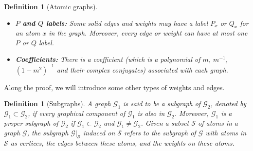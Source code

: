 \documentclass{article}
\newcommand{\1}{\mathds{1}}
\numberwithin{equation}{section}
\newcommand{\be}{\begin{equation}}
\newcommand{\ee}{\end{equation}}
\renewcommand{\cal}{\mathcal}
\newcommand{\dashed}{\text{diffusive}}
\theoremstyle{plain} %
\newtheorem{definition}[theorem]{Definition}
\theoremstyle{remark}
\newtheorem{example}[theorem]{Example}
\newcommand{\cor}{\color{red}}
\newcommand{\AT}{\mathcal A_T}
\newcommand{\hty}[1]{{\cor (ht: #1) }}
\begin{document}
\begin{definition}[Atomic graphs]
\begin{itemize}
		
		\item{\bf $P$ and $Q$ labels:} Some solid edges and weights may have a label $P_x$ or $Q_x$ for an atom $x$ in the graph. Moreover, every edge or weight can have at most one $P$ or $Q$ label. 
		
		
		\item{\bf Coefficients:} There is a coefficient (which is a polynomial of $m$, $m^{-1}$, $(1-m^2)^{-1}$ and their complex conjugates) associated with each graph.  
		
		
	\end{itemize}
	
\end{definition}

Along the proof, we will introduce some other types of weights and edges.


\begin{definition}[Subgraphs]\label{def_sub}
	A graph $\cal G_1$ is said to be a subgraph of $\cal G_2$, denoted by $\cal G_1\subset \cal G_2$, if every graphical component of $\cal G_1$ is also in $\cal G_2$. Moreover, $\cal G_1 $ is a proper subgraph of $\cal G_2$ if  $\cal G_1\subset \cal G_2$ and $\cal G_1\ne \cal G_2$. Given a subset $\cal S$ of atoms in a graph $\cal G$, the subgraph $\cal G|_{\cal S}$ induced on $\cal S$ %
	refers to the subgraph of $\cal G$ with atoms in $\cal S$ as vertices, the edges between these atoms, and the weights on these atoms.  
\end{definition}

%
\end{document}
